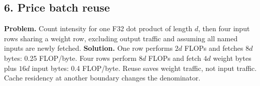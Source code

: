 \subsection*{6. Price batch reuse}
\textbf{Problem.} Count intensity for one F32 dot product of length
$d$, then four input rows sharing a weight row, excluding output traffic
and assuming all named inputs are newly fetched.
\textbf{Solution.} One row performs $2d$ FLOPs and fetches $8d$ bytes:
0.25 FLOP/byte. Four rows perform $8d$ FLOPs and fetch
$4d$ weight bytes plus $16d$ input bytes: 0.4 FLOP/byte.
Reuse saves weight traffic, not input traffic. Cache residency at
another boundary changes the denominator.
